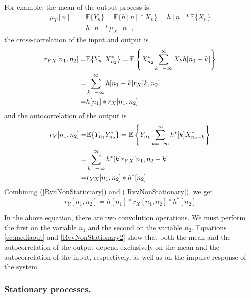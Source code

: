 For example, the mean of the output process is
\begin{align}
\mu_Y[n] 
	=& \mathbb{E}\{Y_n\} = \mathbb{E}\{h[n] \ast X_n\}
    =  h[n]*\mathbb{E}\{X_n\}                                    \nonumber\\
    =& h[n]*\mu_X[n],
\label{ec:mediaout}
\end{align}
the cross-correlation of the input and output is
\begin{align}
r_{YX}[n_1,n_2] 
	=& \mathbb{E}\{Y_{n_1} X_{n_2}^*\}
  	= \mathbb{E}\left\{X_{n_2}^* \sum_{k=-\infty}^{\infty} X_k h[n_1-k] \right\} \nonumber \\
    =& \sum_{k=-\infty}^{\infty} h[n_1-k] r_X[k, n_2] \nonumber \\
    =& h[n_1] \ast r_X[n_1, n_2]
\label{RvuNonStationary}
\end{align}
and the autocorrelation of the output is
\begin{align}
r_{Y}[n_1, n_2] 
   =& \mathbb{E}\{Y_{n_1} Y_{n_2}^* \}
   =  \mathbb{E}\left\{Y_{n_1} \sum_{k=-\infty}^{\infty} h^*[k] X_{n_2-k}^* \right\} \nonumber\\
   =& \sum_{k=-\infty}^{\infty} h^*[k] r_{YX}[n_1, n_2 - k]                 \nonumber\\
   =& r_{YX}[n_1, n_2] \ast h^*[n_2]
  \label{RvvNonStationary}
\end{align}
Combining (\ref{RvuNonStationary}) and (\ref{RvvNonStationary}), we get
\begin{equation}
r_Y[n_1,n_2] = h[n_1]*r_X[n_1, n_2]*h^*[n_2]
\label{RvvNonStationary2}
\end{equation}

In the above equation, there are two convolution operations. We must perform the first on the variable $n_1$ and the second on the variable $n_2$. Equations \eqref{ec:mediaout} and \eqref{RvvNonStationary2} show that both the mean and the autocorrelation of the output depend exclusively on the mean and the autocorrelation of the input, respectively, as well as on the impulse response of the system.



\subsubsection{Stationary processes.}

